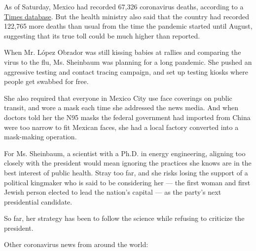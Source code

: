 As of Saturday, Mexico had recorded 67,326 coronavirus deaths, according
to a
\href{https://www.nytimes3xbfgragh.onion/interactive/2020/world/americas/mexico-coronavirus-cases.html}{Times
database}. But the health ministry also said that the country had
recorded 122,765 more deaths than usual from the time the pandemic
started until August, suggesting that its true toll could be much higher
than reported.

When Mr. López Obrador was still kissing babies at rallies and comparing
the virus to the flu, Ms. Sheinbaum was planning for a long pandemic.
She pushed an aggressive testing and contact tracing campaign, and set
up testing kiosks where people get swabbed for free.

She also required that everyone in Mexico City use face coverings on
public transit, and wore a mask each time she addressed the news media.
And when doctors told her the N95 masks the federal government had
imported from China were too narrow to fit Mexican faces, she had a
local factory converted into a mask-making operation.

For Ms. Sheinbaum, a scientist with a Ph.D. in energy engineering,
aligning too closely with the president would mean ignoring the
practices she knows are in the best interest of public health. Stray too
far, and she risks losing the support of a political kingmaker who is
said to be considering her --- the first woman and first Jewish person
elected to lead the nation's capital --- as the party's next
presidential candidate.

So far, her strategy has been to follow the science while refusing to
criticize the president.

Other coronavirus news from around the world:

